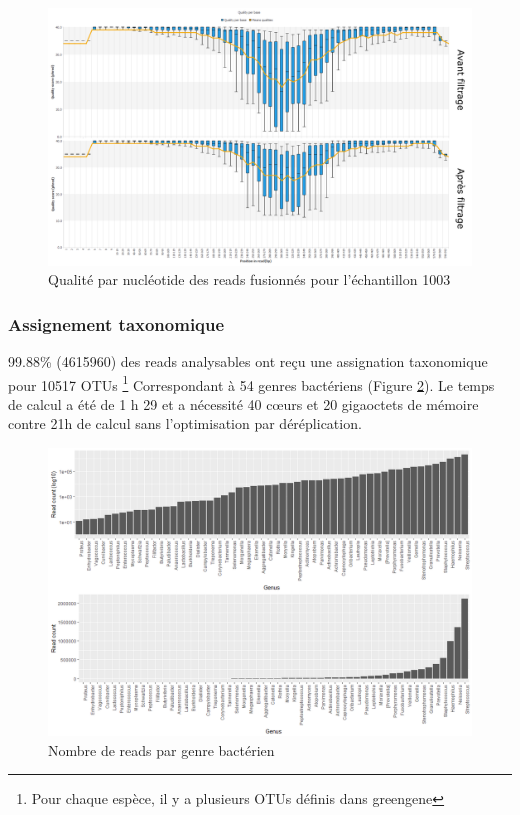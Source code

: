 \documentclass[12pt,a4paper]{article}
\begin{document}
\begin{figure}[h]
\begin{center}
\includegraphics[scale=0.45]{img/duo_merging.png}\hfill
\end{center}
\caption{Qualité par nucléotide des reads fusionnés pour l'échantillon 1003}
\label{fastqt_after}
\end{figure}


\subsubsection{Assignement taxonomique}
99.88\% (4615960) des reads analysables ont reçu une assignation taxonomique pour 10517 OTUs \footnote{Pour chaque espèce, il y a plusieurs OTUs définis dans greengene} Correspondant à 54 genres bactériens (Figure \ref{readgenus}). 
Le temps de calcul a été de 1 h 29 et a nécessité 40 cœurs et 20 gigaoctets de mémoire contre 21h de calcul sans l’optimisation par déréplication.


\begin{figure}[h]
\begin{center}
\includegraphics[scale=0.5]{img/read_count_genus_all.png}\hfill
\end{center}
\caption{Nombre de reads par genre bactérien}
\label{readgenus}
\end{figure}
\end{document}
